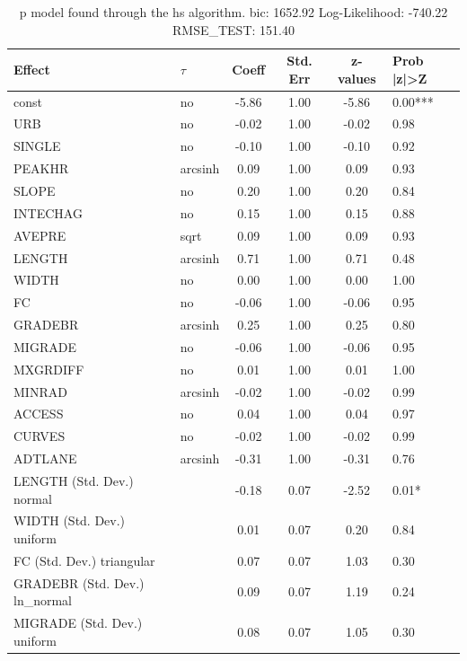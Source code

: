 \begin{table}
	\caption{p model found through the hs algorithm. bic: 1652.92 Log-Likelihood: -740.22 RMSE_TEST: 151.40}
	\begin{center}
		\begin{tabular}{|l|l|c|c|c|l|}
			\hline
			Effect & $\tau$ & Coeff & Std. Err & z-values & Prob |z|>Z \\
			\hline
			const & no & -5.86 & 1.00 & -5.86 & 0.00*** \\
			\hline
			URB & no & -0.02 & 1.00 & -0.02 & 0.98 \\
			\hline
			SINGLE & no & -0.10 & 1.00 & -0.10 & 0.92 \\
			\hline
			PEAKHR & arcsinh & 0.09 & 1.00 & 0.09 & 0.93 \\
			\hline
			SLOPE & no & 0.20 & 1.00 & 0.20 & 0.84 \\
			\hline
			INTECHAG & no & 0.15 & 1.00 & 0.15 & 0.88 \\
			\hline
			AVEPRE & sqrt & 0.09 & 1.00 & 0.09 & 0.93 \\
			\hline
			LENGTH & arcsinh & 0.71 & 1.00 & 0.71 & 0.48 \\
			\hline
			WIDTH & no & 0.00 & 1.00 & 0.00 & 1.00 \\
			\hline
			FC & no & -0.06 & 1.00 & -0.06 & 0.95 \\
			\hline
			GRADEBR & arcsinh & 0.25 & 1.00 & 0.25 & 0.80 \\
			\hline
			MIGRADE & no & -0.06 & 1.00 & -0.06 & 0.95 \\
			\hline
			MXGRDIFF & no & 0.01 & 1.00 & 0.01 & 1.00 \\
			\hline
			MINRAD & arcsinh & -0.02 & 1.00 & -0.02 & 0.99 \\
			\hline
			ACCESS & no & 0.04 & 1.00 & 0.04 & 0.97 \\
			\hline
			CURVES & no & -0.02 & 1.00 & -0.02 & 0.99 \\
			\hline
			ADTLANE & arcsinh & -0.31 & 1.00 & -0.31 & 0.76 \\
			\hline
			LENGTH (Std. Dev.) normal &  & -0.18 & 0.07 & -2.52 & 0.01* \\
			\hline
			WIDTH (Std. Dev.) uniform &  & 0.01 & 0.07 & 0.20 & 0.84 \\
			\hline
			FC (Std. Dev.) triangular &  & 0.07 & 0.07 & 1.03 & 0.30 \\
			\hline
			GRADEBR (Std. Dev.) ln_normal &  & 0.09 & 0.07 & 1.19 & 0.24 \\
			\hline
			MIGRADE (Std. Dev.) uniform &  & 0.08 & 0.07 & 1.05 & 0.30 \\

\end{tabular}
\end{center}
\end{table}
